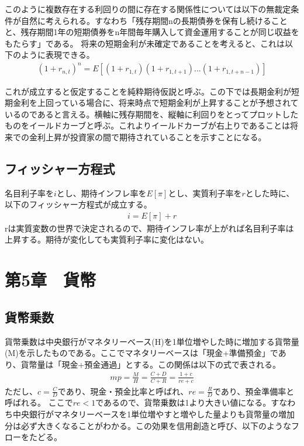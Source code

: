 \documentclass{jsarticle}
\begin{document}
このように複数存在する利回りの間に存在する関係性については以下の無裁定条件が自然に考えられる。すなわち「残存期間nの長期債券を保有し続けることと、残存期間1年の短期債券をn年間毎年購入して資金運用することが同じ収益をもたらす」である。
将来の短期金利が未確定であることを考えると、これは以下のように表現できる。
\begin{align}
	(1 + r_{n, t})^n = E[(1 + r_{1,t})(1 + r_{1, t+1})\dots(1 + r_{1,t+n-1})]
\end{align}

これが成立すると仮定することを純粋期待仮説と呼ぶ。この下では長期金利が短期金利を上回っている場合に、将来時点で短期金利が上昇することが予想されているのであると言える。横軸に残存期間を、縦軸に利回りをとってプロットしたものをイールドカーブと呼ぶ。これよりイールドカーブが右上りであることは将来での金利上昇が投資家の間で期待されていることを示すことになる。

\subsection{フィッシャー方程式}
名目利子率を$i$とし、期待インフレ率を$E[\pi]$とし、実質利子率を$r$とした時に、以下のフィッシャー方程式が成立する。
\begin{align}
	i = E[\pi] + r
\end{align}
rは実質変数の世界で決定されるので、期待インフレ率が上がれば名目利子率は上昇する。期待が変化しても実質利子率に変化はない。

\section{第5章　貨幣}
\subsection{貨幣乗数}
貨幣乗数は中央銀行がマネタリーベース(H)を1単位増やした時に増加する貨幣量(M)を示したものである。ここでマネタリーベースは「現金+準備預金」であり、貨幣量は「現金+預金通過」とする。この関係は以下の式で表される。
\begin{align*}
	mp = \frac{M}{H} = \frac{C + D}{C + R} = \frac{1 + c}{re + c}
\end{align*}
ただし、$c = \frac{C}{D}$であり、現金・預金比率と呼ばれ、$re = \frac{R}{D}$であり、預金準備率と呼ばれる。
ここで$re < 1$であるので、貨幣乗数は1より大きい値になる。すなわち中央銀行がマネタリーベースを1単位増やすと増やした量よりも貨幣量の増加分は必ず大きくなることがわかる。この効果を信用創造と呼び、以下のようなフローをたどる。
\end{document}
